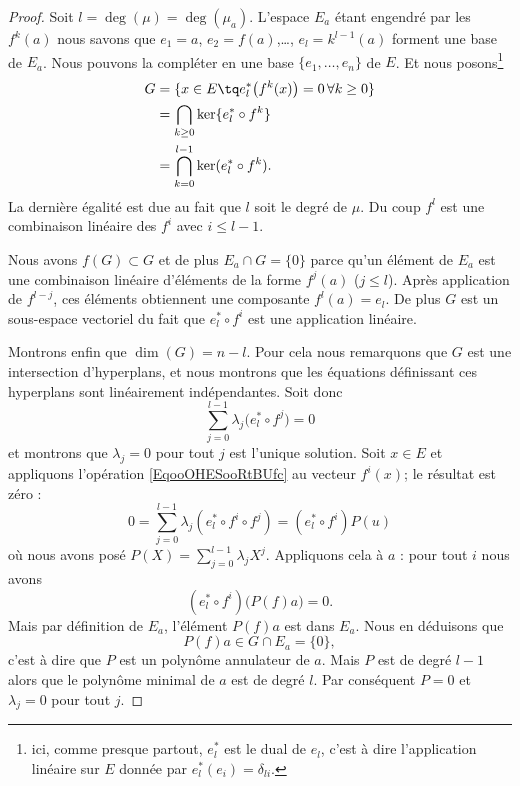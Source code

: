 \begin{proof}
    Soit \( l=\deg(\mu)=\deg(\mu_a)\). L'espace \( E_a\) étant engendré par les \( f^k(a)\) nous savons que \( e_1=a\), \( e_2=f(a)\),\ldots, \( e_l=k^{l-1}(a)\) forment une base de \( E_a\). Nous pouvons la compléter en une base \( \{ e_1,\ldots, e_n \}\) de \( E\). Et nous posons\footnote{ici, comme presque partout, \( e^*_{l}\) est le dual de \( e_l\), c'est à dire l'application linéaire sur \( E\) donnée par \( e^*_l(e_i)=\delta_{li}\). }
    \begin{subequations}
        \begin{align}
            G&=\{ x\in E\tq e^*_l\big( f^k(x) \big)=0\,\forall k\geq 0 \}\\
            &=\bigcap_{k\geq 0}\ker\{ e^*_l\circ f^k \}\\
            &=\bigcap_{k=0}^{l-1}\ker(  e^*_l\circ f^k ).
        \end{align}
    \end{subequations}
    La dernière égalité est due au fait que \( l\) soit le degré de \( \mu\). Du coup \( f^l\) est une combinaison linéaire des \( f^i\) avec \( i\leq l-1\).

    Nous avons \( f(G)\subset G\) et de plus \( E_a\cap G=\{ 0 \}\) parce qu'un élément de \( E_a\) est une combinaison linéaire d'éléments de la forme \( f^j(a)\) (\( j\leq l\)). Après application de \( f^{l-j}\), ces éléments obtiennent une composante \( f^l(a)=e_l\). De plus \( G\) est un sous-espace vectoriel du fait que \( e^*_l\circ f^i\) est une application linéaire. 
    
    Montrons enfin que \( \dim(G)=n-l\). Pour cela nous remarquons que \( G\) est une intersection d'hyperplans, et nous montrons que les équations définissant ces hyperplans sont linéairement indépendantes. Soit donc 
    \begin{equation}        \label{EqooOHESooRtBUfc}
        \sum_{j=0}^{l-1}\lambda_j\big( e^*_l\circ f^j \big)=0
    \end{equation}
    et montrons que \( \lambda_j=0\) pour tout $j$ est l'unique solution. Soit \( x\in E\) et appliquons l'opération \eqref{EqooOHESooRtBUfc} au vecteur \( f^i(x)\); le résultat est zéro :
    \begin{equation}
        0=\sum_{j=0}^{l-1}\lambda_j(e^*_l\circ f^i\circ f^j)=(e^*_l\circ f^i)P(u)
    \end{equation}
    où nous avons posé \( P(X)=\sum_{j=0}^{l-1}\lambda_jX^j\). Appliquons cela à \( a\) : pour tout \( i\) nous avons
    \begin{equation}
        (e^*_l\circ f^i)\big( P(f)a \big)=0.
    \end{equation}
    Mais par définition de \( E_a\), l'élément \(P(f)a \) est dans \( E_a\). Nous en déduisons que 
    \begin{equation}
        P(f)a\in G\cap E_a=\{ 0 \},
    \end{equation}
    c'est à dire que \( P\) est un polynôme annulateur de \( a\). Mais \( P\) est de degré \( l-1\) alors que le polynôme minimal de \( a\) est de degré \( l\). Par conséquent \( P=0\) et \( \lambda_j=0\) pour tout \( j\).
\end{proof}

